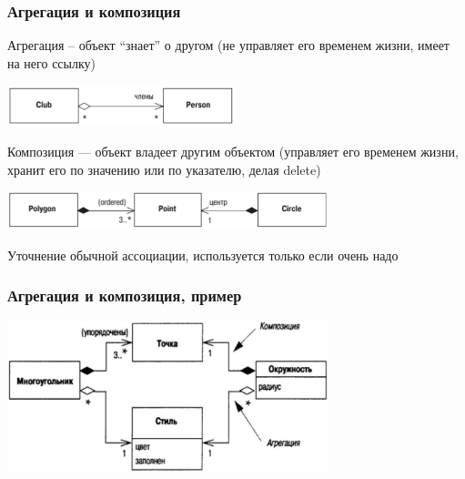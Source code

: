 \documentclass{../../slides-style}
\begin{document}
    \begin{frame}
        \frametitle{Агрегация и композиция}
        Агрегация – объект ``знает'' о другом (не управляет его временем жизни, имеет на него ссылку)
        \begin{center}
            \includegraphics[width=0.5\textwidth]{aggregations.png}
        \end{center}
        Композиция --- объект владеет другим объектом (управляет его временем жизни, хранит его по значению или по указателю, делая delete)
        \begin{center}
            \includegraphics[width=0.7\textwidth]{compositions.png}
        \end{center}
        Уточнение обычной ассоциации, используется только если очень надо
    \end{frame}

    \begin{frame}
        \frametitle{Агрегация и композиция, пример}
        \begin{center}
            \includegraphics[width=0.7\textwidth]{aggregationAndCompositionExample.png}
        \end{center}
    \end{frame}
\end{document}

